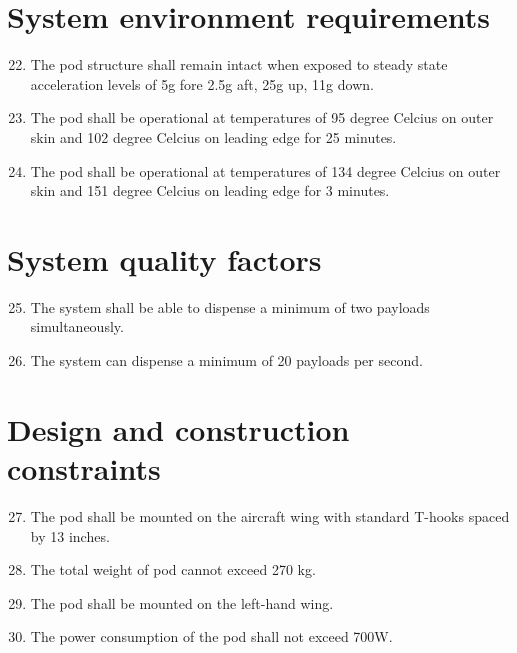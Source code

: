 \documentclass[Main]{subfiles}
\begin{document}
\section{System environment requirements}

\begin{enumerate}[{SR}-1]
\setcounter{enumi}{21}
\item The pod structure shall remain intact when exposed to steady state acceleration levels of 5g fore 2.5g aft, 25g up, 11g down.\label{SR-22}

\item The pod shall be operational at temperatures of 95 degree Celcius on outer skin and 102 degree Celcius on leading edge for 25 minutes.\label{SR-23}

\item The pod shall be operational at temperatures of 134 degree Celcius on outer skin and 151 degree Celcius on leading edge for 3 minutes.\label{SR-24}

\end{enumerate}



\section{System quality factors}

\begin{enumerate}[{SR}-1]
\setcounter{enumi}{24}
\item The system shall be able to dispense a minimum of two payloads simultaneously.\label{SR-25}

\item The system can dispense a minimum of 20 payloads per second.\label{SR-26}
\end{enumerate}

\section{Design and construction constraints}

\begin{enumerate}[{SR}-1]
\setcounter{enumi}{26}
\item The pod shall be mounted on the aircraft wing with standard T-hooks spaced by 13 inches.\label{SR-27}

\item The total weight of pod cannot exceed 270 kg.\label{SR-28}

\item The pod shall be mounted on the left-hand wing.\label{SR-29}

\item The power consumption of the pod shall not exceed 700W.\label{SR-30}
\end{enumerate}
\end{document}
